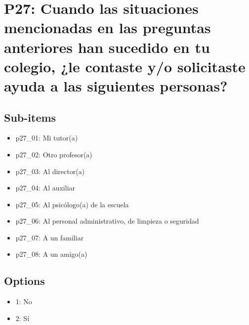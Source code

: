 \documentclass[11pt]{article}
\begin{document}
\section*{P27: Cuando las situaciones mencionadas en las preguntas anteriores han sucedido en tu colegio, ¿le contaste y/o solicitaste ayuda a las siguientes personas?}
\subsection*{Sub-items}
\begin{itemize}[leftmargin=*]
  \item p27\_01: Mi tutor(a)
  \item p27\_02: Otro profesor(a)
  \item p27\_03: Al director(a)
  \item p27\_04: Al auxiliar
  \item p27\_05: Al psicólogo(a) de la escuela
  \item p27\_06: Al personal administrativo, de limpieza o seguridad
  \item p27\_07: A un familiar
  \item p27\_08: A un amigo(a)
\end{itemize}
\subsection*{Options}
\begin{itemize}[leftmargin=*]
  \item 1: No
  \item 2: Sí
\end{itemize}
\bigskip
\end{document}
